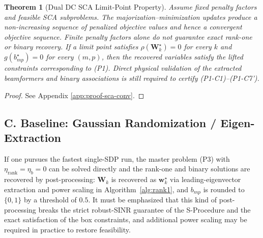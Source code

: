 \documentclass[12pt,a4paper]{article}
\newtheorem{theorem}{Theorem}
\newcommand{\vect}[1]{\mathbf{#1}}
\newcommand{\mat}[1]{\mathbf{#1}}
\begin{document}
\begin{theorem}[Dual DC SCA Limit-Point Property]\label{thm:sca-conv}
Assume fixed penalty factors and feasible SCA subproblems. The majorization--minimization updates produce a non-increasing sequence of penalized objective values and hence a convergent objective sequence. Finite penalty factors alone do not guarantee exact rank-one or binary recovery. If a limit point satisfies $\rho(\mat{W}_k^\star)=0$ for every $k$ and $g(b_{mp}^\star)=0$ for every $(m,p)$, then the recovered variables satisfy the lifted constraints corresponding to (P1). Direct physical validation of the extracted beamformers and binary associations is still required to certify (P1-C1)--(P1-C7').
\end{theorem}

\begin{proof}
See Appendix \ref{app:proof-sca-conv}.
\end{proof}

\subsection*{C. Baseline: Gaussian Randomization / Eigen-Extraction}

If one pursues the fastest single-SDP run, the master problem (P3) with $\eta_{\text{rank}} = \eta_b = 0$ can be solved directly and the rank-one and binary solutions are recovered by post-processing: $\mat{W}_k$ is recovered as $\vect{w}_k^\star$ via leading-eigenvector extraction and power scaling in Algorithm~\ref{alg:rank1}, and $b_{mp}$ is rounded to $\{0,1\}$ by a threshold of $0.5$. It must be emphasized that this kind of post-processing breaks the strict robust-SINR guarantee of the S-Procedure and the exact satisfaction of the box constraints, and additional power scaling may be required in practice to restore feasibility.
\end{document}

